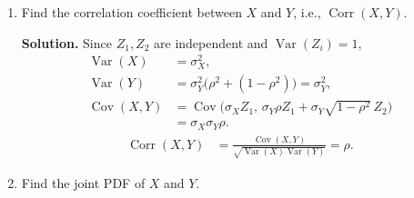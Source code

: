 \documentclass[11pt]{article}
\newcommand{\Var}{\operatorname{Var}}
\newcommand{\Cov}{\operatorname{Cov}}
\newcommand{\Corr}{\operatorname{Corr}}
\begin{document}
\begin{enumerate}[label=\arabic*., leftmargin=1.6em]
\begin{enumerate}
\textbf{Solution.}
For any \(a,b\in\mathbb{R}\),
\begin{align*}
aX+bY
&= a\mu_{X}+b\mu_{Y}
+(a\sigma_{X}+b\sigma_{Y}\rho)Z_{1}
+b\sigma_{Y}\sqrt{1-\rho^{2}}\,Z_{2}.
\end{align*}
The right-hand side is an affine function of the independent standard normals \(Z_{1},Z_{2}\), hence normal. Every linear combination of \(X\) and \(Y\) is normal, so \((X,Y)\) is bivariate normal.

\item Find the correlation coefficient between $X$ and $Y$, i.e., $\Corr(X,Y)$.

\textbf{Solution.}
Since \(Z_{1},Z_{2}\) are independent and \(\Var(Z_{i})=1\),
\begin{align*}
\Var(X)
&= \sigma_{X}^{2}, \\
\Var(Y)
&= \sigma_{Y}^{2}\bigl(\rho^{2}+(1-\rho^{2})\bigr)
= \sigma_{Y}^{2}, \\
\Cov(X,Y)
&= \Cov\bigl(\sigma_{X}Z_{1},\,\sigma_{Y}\rho Z_{1}+\sigma_{Y}\sqrt{1-\rho^{2}}\,Z_{2}\bigr) \\
&= \sigma_{X}\sigma_{Y}\rho.
\end{align*}
\begin{align*}
\Corr(X,Y)
&= \frac{\Cov(X,Y)}{\sqrt{\Var(X)\Var(Y)}}
= \rho.
\end{align*}

\item Find the joint PDF of $X$ and $Y$.


\end{enumerate}
\end{enumerate}
\end{document}
